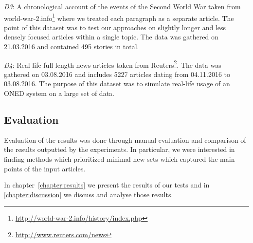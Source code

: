 \emph{D3}: A chronological account of the events of the Second World War taken from world-war-2.info\footnote{\url{http://world-war-2.info/history/index.php}} where we treated each paragraph as a separate article. The point of this dataset was to test our approaches on slightly longer and less densely focused articles within a single topic. The data was gathered on 21.03.2016 and contained 495 stories in total.

\emph{D4}: Real life full-length news articles taken from Reuters\footnote{\url{http://www.reuters.com/news}}. The data was gathered on 03.08.2016 and includes 5227 articles dating from 04.11.2016 to 03.08.2016. The purpose of this dataset was to simulate real-life usage of an ONED system on a large set of data.

\subsection{Evaluation}
Evaluation of the results was done through manual evaluation and comparison of the results outputted by the experiments. In particular, we were interested in finding methods which prioritized minimal new sets which captured the main points of the input articles. 


In chapter~\ref{chapter:results} we present the results of our tests and in \cref{chapter:discussion} we discuss and analyse those results.
